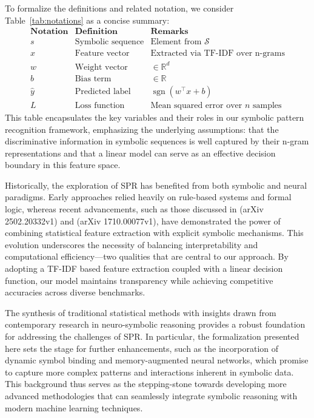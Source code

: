 \documentclass{article}
\begin{document}
To formalize the definitions and related notation, we consider Table~\ref{tab:notations} as a concise summary:
\[
\begin{array}{lcl}
\textbf{Notation} & \textbf{Definition} & \textbf{Remarks} \\ \hline
s       & \text{Symbolic sequence} & \text{Element from } \mathcal{S} \\
x       & \text{Feature vector}      & \text{Extracted via TF-IDF over n-grams} \\
w       & \text{Weight vector}       & \in \mathbb{R}^d \\
b       & \text{Bias term}           & \in \mathbb{R} \\
\hat{y} & \text{Predicted label}     & \operatorname{sgn}(w^\top x + b) \\
L       & \text{Loss function}       & \text{Mean squared error over } n \text{ samples}
\end{array}
\]
This table encapsulates the key variables and their roles in our symbolic pattern recognition framework, emphasizing the underlying assumptions: that the discriminative information in symbolic sequences is well captured by their n-gram representations and that a linear model can serve as an effective decision boundary in this feature space.

Historically, the exploration of SPR has benefited from both symbolic and neural paradigms. Early approaches relied heavily on rule-based systems and formal logic, whereas recent advancements, such as those discussed in (arXiv 2502.20332v1) and (arXiv 1710.00077v1), have demonstrated the power of combining statistical feature extraction with explicit symbolic mechanisms. This evolution underscores the necessity of balancing interpretability and computational efficiency—two qualities that are central to our approach. By adopting a TF-IDF based feature extraction coupled with a linear decision function, our model maintains transparency while achieving competitive accuracies across diverse benchmarks.

The synthesis of traditional statistical methods with insights drawn from contemporary research in neuro-symbolic reasoning provides a robust foundation for addressing the challenges of SPR. In particular, the formalization presented here sets the stage for further enhancements, such as the incorporation of dynamic symbol binding and memory-augmented neural networks, which promise to capture more complex patterns and interactions inherent in symbolic data. This background thus serves as the stepping-stone towards developing more advanced methodologies that can seamlessly integrate symbolic reasoning with modern machine learning techniques.
\end{document}
